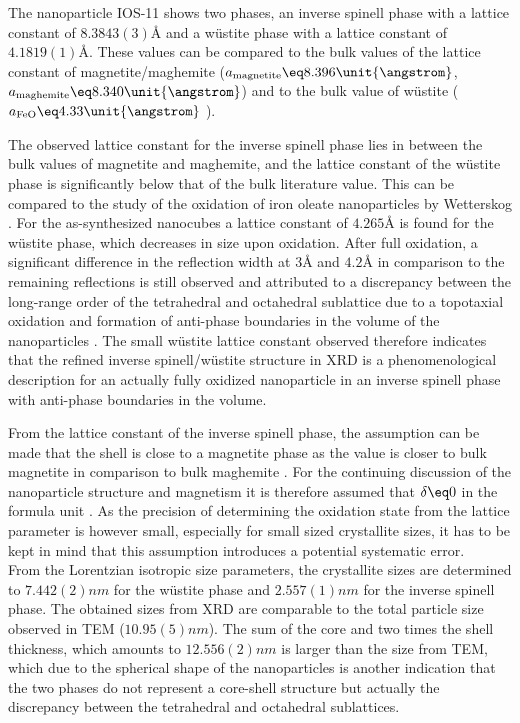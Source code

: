 \documentclass[\main/dresen_thesis.tex]{subfiles}
\begin{document}
    The nanoparticle IOS-11 shows two phases, an inverse spinell phase with a lattice constant of $8.3843(3) \unit{\angstrom}$ and a w\"ustite phase with a lattice constant of $4.1819(1) \unit{\angstrom}$.
    These values can be compared to the bulk values of the lattice constant of magnetite/maghemite ($a_\mathrm{magnetite} \eq 8.396 \unit{\angstrom}$, $a_\mathrm{maghemite} \eq 8.340 \unit{\angstrom}$) \cite{Cornell_2003_Their} and to the bulk value of w\"ustite ($a_\mathrm{FeO} \eq 4.33 \unit{\angstrom}$ \cite{Hentschel_1970_Stoich}).

    The observed lattice constant for the inverse spinell phase lies in between the bulk values of magnetite and maghemite, and the lattice constant of the w\"ustite phase is significantly below that of the bulk literature value.
    This can be compared to the study of the oxidation of iron oleate nanoparticles by Wetterskog \etal \cite{Wetterskog_2013_Anoma}.
    For the as-synthesized nanocubes a lattice constant of $4.265 \unit{\angstrom}$ is found for the w\"ustite phase, which decreases in size upon oxidation.
    After full oxidation, a significant difference in the reflection width at $3 \unit{\angstrom}$ and $4.2 \unit{\angstrom}$ in comparison to the remaining reflections is still observed and attributed to a discrepancy between the long-range order of the tetrahedral and octahedral sublattice due to a topotaxial oxidation and formation of anti-phase boundaries in the volume of the nanoparticles \cite{Wetterskog_2013_Anoma}.
    The small w\"ustite lattice constant observed therefore indicates that the refined inverse spinell/w\"ustite structure in XRD is a phenomenological description for an actually fully oxidized nanoparticle in an inverse spinell phase with anti-phase boundaries in the volume.

    From the lattice constant of the inverse spinell phase, the assumption can be made that the shell is close to a magnetite phase as the value is closer to bulk magnetite in comparison to bulk maghemite \cite{Cervellino_2014_Latti}.
    For the continuing discussion of the nanoparticle structure and magnetism it is therefore assumed that $\delta \eq 0$ in the formula unit  .
    As the precision of determining the oxidation state from the lattice parameter is however small, especially for small sized crystallite sizes, it has to be kept in mind that this assumption introduces a potential systematic error.
    \\

    From the Lorentzian isotropic size parameters, the crystallite sizes are determined to $7.442(2) \unit{nm}$ for the w\"ustite phase and $2.557(1) \unit{nm}$ for the inverse spinell phase.
    The obtained sizes from XRD are comparable to the total particle size observed in TEM ($10.95(5) \unit{nm}$).
    The sum of the core and two times the shell thickness, which amounts to $12.556(2) \unit{nm}$ is larger than the size from TEM, which due to the spherical shape of the nanoparticles is another indication that the two phases do not represent a core-shell structure but actually the discrepancy between the tetrahedral and octahedral sublattices.


\end{document}
